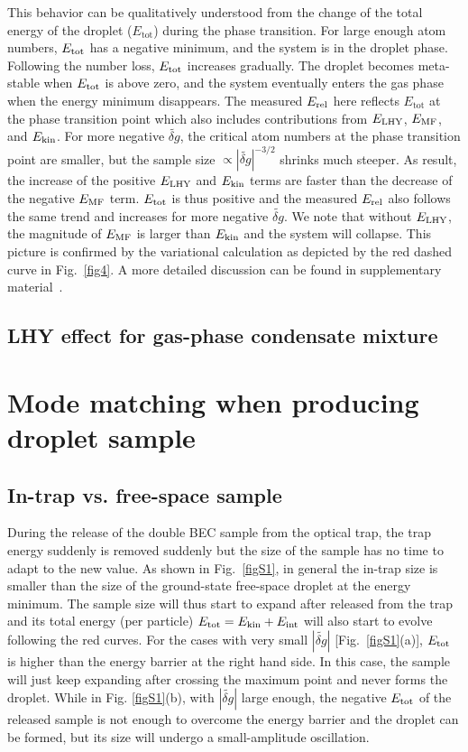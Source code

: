 This behavior can be qualitatively understood from the change of the total energy of the droplet ($E_\text{tot}$) during the phase transition. For large enough atom numbers, $E_{\rm tot}$ has a negative minimum, and the system is in the droplet phase. 
Following the number loss, $E_{\rm tot}$ increases gradually. The droplet becomes meta-stable when $E_{\rm tot}$ is above zero, and the system eventually enters the gas phase when the energy minimum disappears. The measured $E_{\rm rel}$ here reflects $E_\text{tot}$ at the phase transition point which also includes contributions from $E_{\rm LHY}$, $E_{\rm MF}$, and $E_{\rm kin}$.
%
For more negative $\widetilde{\delta g}$, the critical atom numbers at the phase transition point are smaller, but the sample size $\propto |\widetilde{\delta g}|^{-3/2}$ shrinks much steeper. As result, the increase of the positive $E_{\rm LHY}$ and $E_{\rm kin}$ terms are faster than the decrease of the negative $E_{\rm MF}$ term. $E_{\rm tot}$ is thus positive and the measured $E_{\rm rel}$ also follows the same trend and increases for more negative $\widetilde{\delta g}$. We note that without $E_{\rm LHY}$, the magnitude of $E_{\rm MF}$ is larger than $E_{\rm kin}$ and the system will collapse. This picture is confirmed by the variational calculation as depicted by the red dashed curve in Fig.~\ref{fig4}. A more detailed discussion can be found in supplementary material~\cite{SM}.       

\subsection{LHY effect for gas-phase condensate mixture}

\section{Mode matching when producing droplet sample}
\subsection{In-trap vs. free-space sample}

During the release of the double BEC sample from the optical trap, the trap energy suddenly is removed suddenly but the size of the sample has no time to adapt to the new value. As shown in Fig.~\ref{figS1}, in general the in-trap size is smaller than the size of the ground-state free-space droplet at the energy minimum. The sample size will thus start to expand after released from the trap and its total energy (per particle) $E_{\rm tot} = E_{\rm kin} + E_{\rm int}$ will also start to evolve following the red curves. For the cases with very small $|\widetilde{\delta g}|$ [Fig.~\ref{figS1}(a)], $E_{\rm tot}$ is higher than the energy barrier at the right hand side. In this case, the sample will just keep expanding after crossing the maximum point and never forms the droplet.
While in Fig. \ref{figS1}(b), with $|\widetilde{\delta g}|$ large enough, 
the negative $E_{\rm tot}$ of the released sample is not enough to overcome the energy barrier and the droplet can be formed, but its size will undergo a small-amplitude oscillation.




